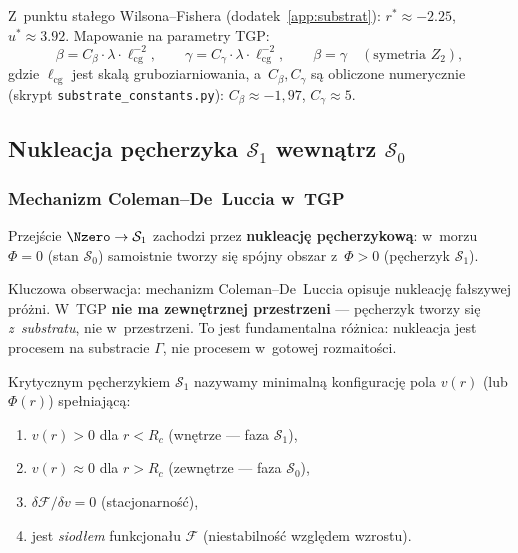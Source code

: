 Z~punktu sta\l{}ego Wilsona--Fishera (dodatek~\ref{app:substrat}):
$r^* \approx -2.25$, $u^* \approx 3.92$. Mapowanie na
parametry TGP:
\begin{equation}\label{eq:substrate-to-TGP}
    \beta = C_\beta \cdot \lambda \cdot \ell_\mathrm{cg}^{-2},
    \qquad
    \gamma = C_\gamma \cdot \lambda \cdot \ell_\mathrm{cg}^{-2},
    \qquad
    \beta = \gamma \quad (\text{symetria }Z_2),
\end{equation}
gdzie $\ell_\mathrm{cg}$ jest skal\k{a} gruboziarniowania,
a~$C_\beta, C_\gamma$ s\k{a} obliczone numerycznie
(skrypt \texttt{substrate\_constants.py}):
$C_\beta \approx -1{,}97$, $C_\gamma \approx 5$.

\subsection{Nukleacja p\k{e}cherzyka $\mathcal{S}_1$
  wewn\k{a}trz $\mathcal{S}_0$}%
\label{app:G-nukleacja}

\subsubsection{Mechanizm Coleman--De~Luccia w~TGP}

Przej\'scie $\Nzero \to \mathcal{S}_1$ zachodzi przez
\textbf{nukleacj\k{e} p\k{e}cherzykow\k{a}}: w~morzu
$\Phi = 0$ (stan $\mathcal{S}_0$) samoistnie tworzy si\k{e}
sp\'ojny obszar z~$\Phi > 0$ (p\k{e}cherzyk $\mathcal{S}_1$).

Kluczowa obserwacja: mechanizm Coleman--De~Luccia
\cite{Coleman:1977py} opisuje nukleacj\k{e} fa\l{}szywej pr\'o\.zni.
W~TGP \textbf{nie ma zewn\k{e}trznej przestrzeni} ---
p\k{e}cherzyk tworzy si\k{e} \emph{z~substratu}, nie
w~przestrzeni. To jest fundamentalna r\'o\.znica:
nukleacja jest procesem na substracie $\Gamma$,
nie procesem w~gotowej rozmaito\'sci.

\begin{definition}\label{def:critical-bubble}
Krytycznym p\k{e}cherzykiem $\mathcal{S}_1$ nazywamy
minimaln\k{a} konfiguracj\k{e} pola $v(r)$ (lub $\Phi(r)$)
spe\l{}niaj\k{a}c\k{a}:
\begin{enumerate}[nosep]
  \item $v(r) > 0$ dla $r < R_c$ (wn\k{e}trze --- faza $\mathcal{S}_1$),
  \item $v(r) \approx 0$ dla $r > R_c$ (zewn\k{e}trze --- faza $\mathcal{S}_0$),
  \item $\delta \mathcal{F}/\delta v = 0$ (stacjonarno\'s\'c),
  \item jest \emph{siod\l{}em} funkcjona\l{}u $\mathcal{F}$
        (niestabilno\'s\'c wzgl\k{e}dem wzrostu).
\end{enumerate}
\end{definition}

